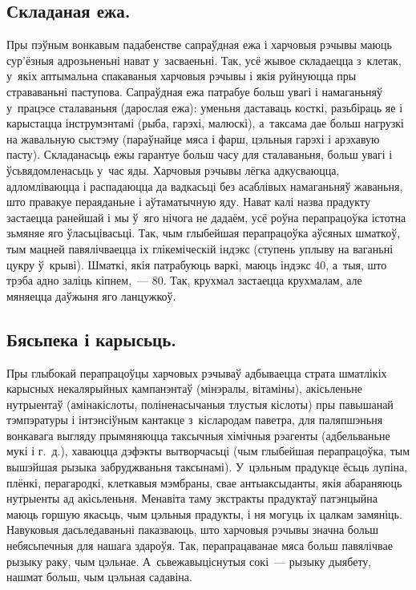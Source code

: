 \subsection{Складаная ежа.}
Пры пэўным вонкавым падабенстве сапраўдная ежа і харчовыя рэчывы маюць сур'ёзныя адрозьненьні нават у~засваеньні. Так, усё жывое складаецца з~клетак, у~якіх аптымальна спакаваныя харчовыя рэчывы і якія руйнуюцца пры страваваньні паступова. Сапраўдная ежа патрабуе больш увагі і намаганьняў у~працэсе сталаваньня (дарослая ежа): уменьня даставаць косткі, разьбіраць яе і карыстацца інструмэнтамі (рыба, гарэхі, малюскі), а~таксама дае больш нагрузкі на жавальную сыстэму (параўнайце мяса і фарш, цэльныя гарэхі і арэхавую пасту). Складанасьць ежы гарантуе больш часу для сталаваньня, больш увагі і ўсьвядомленасьць у~час яды. Харчовыя рэчывы лёгка адкусваюцца, адломліваюцца і распадаюцца да вадкасьці без асаблівых намаганьняў жаваньня, што правакуе пераяданьне і аўтаматычную яду. Нават калі назва прадукту застаецца ранейшай і мы ў~яго нічога не дадаём, усё роўна перапрацоўка істотна зьмяняе яго ўласьцівасьці. Так, чым глыбейшая перапрацоўка аўсяных шматкоў, тым мацней павялічваецца іх глікеміческій індэкс (ступень уплыву на ваганьні цукру ў~крыві). Шматкі, якія патрабуюць варкі, маюць індэкс 40, а~тыя, што трэба адно заліць кіпнем,~--- 80. Так, крухмал застаецца крухмалам, але мяняецца даўжыня яго ланцужкоў.

\subsection{Бясьпека і карысьць.}
Пры глыбокай перапрацоўцы харчовых рэчываў адбываецца страта шматлікіх карысных некалярыйных кампанэнтаў (мінэралы, вітаміны), акісьленьне нутрыентаў (амінакіслоты, поліненасычаныя тлустыя кіслоты) пры павышанай тэмпэратуры і інтэнсіўным кантакце з~кіслародам паветра, для паляпшэньня вонкавага выгляду прымяняюцца таксычныя хімічныя рэагенты (адбельваньне мукі і г.~д.), хаваюцца дэфэкты вытворчасьці (чым глыбейшая перапрацоўка, тым вышэйшая рызыка забруджваньня таксынамі). У~цэльным прадукце ёсьць лупіна, плёнкі, перагародкі, клеткавыя мэмбраны, свае антыаксыданты, якія абараняюць нутрыенты ад акісьленьня. Менавіта таму экстракты прадуктаў патэнцыйна маюць горшую якасьць, чым цэльныя прадукты, і ня могуць іх цалкам замяніць. Навуковыя дасьледаваньні паказваюць, што харчовыя рэчывы значна больш небясьпечныя для нашага здароўя. Так, перапрацаванае мяса больш павялічвае рызыку раку, чым цэльнае. А~сьвежавыціснутыя сокі~--- рызыку дыябету, нашмат больш, чым цэльная садавіна.

